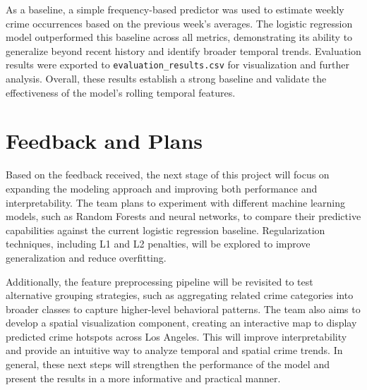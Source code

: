 \documentclass[11pt]{article}
\begin{document}
As a baseline, a simple frequency-based predictor was used to estimate weekly crime occurrences based on the previous week’s averages. The logistic regression model outperformed this baseline across all metrics, demonstrating its ability to generalize beyond recent history and identify broader temporal trends. Evaluation results were exported to \texttt{evaluation\_results.csv} for visualization and further analysis. Overall, these results establish a strong baseline and validate the effectiveness of the model’s rolling temporal features.

\section{Feedback and Plans}

Based on the feedback received, the next stage of this project will focus on expanding the modeling approach and improving both performance and interpretability. The team plans to experiment with different machine learning models, such as Random Forests and neural networks, to compare their predictive capabilities against the current logistic regression baseline. Regularization techniques, including L1 and L2 penalties, will be explored to improve generalization and reduce overfitting. 

Additionally, the feature preprocessing pipeline will be revisited to test alternative grouping strategies, such as aggregating related crime categories into broader classes to capture higher-level behavioral patterns. The team also aims to develop a spatial visualization component, creating an interactive map to display predicted crime hotspots across Los Angeles. This will improve interpretability and provide an intuitive way to analyze temporal and spatial crime trends. In general, these next steps will strengthen the performance of the model and present the results in a more informative and practical manner.

\vspace{1em}


\renewcommand{\refname}{}
\vspace{-3em}
\end{document}
